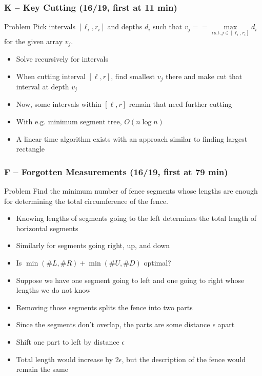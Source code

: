 \documentclass{beamer}
\begin{document}
\begin{frame}
\frametitle{K -- Key Cutting (16/19, first at 11 min)}
    \begin{block}{Problem}
        Pick intervals $[\ell_i, r_i]$ and depths $d_i$ such that $v_j == \underset{i\,\mathrm{s.t.}\,j \in [\ell_i, r_i]}{\max} d_i$ for the given array $v_j$.
    \end{block}
    \begin{itemize}
        \item Solve recursively for intervals
        \item When cutting interval $[\ell, r]$, find smallest $v_j$ there and make cut that interval at depth $v_j$
        \item Now, some intervals within $[\ell, r]$ remain that need further cutting
        \item With e.g. minimum segment tree, $O(n \log n)$
        \item A linear time algorithm exists with an approach similar to finding largest rectangle 
    \end{itemize}
\end{frame}

\begin{frame}
\frametitle{F -- Forgotten Measurements (16/19, first at 79 min)}
    \begin{block}{Problem}
        Find the minimum number of fence segments whose lengths are enough for determining the total circumference of the fence.
    \end{block}
    \begin{itemize}
        \item Knowing lengths of segments going to the left determines the total length of horizontal segments
        \item Similarly for segments going right, up, and down
        \item Is $\min(\#L, \#R) + \min(\#U, \#D)$ optimal?
        \item Suppose we have one segment going to left and one going to right whose lengths we do not know
        \item Removing those segments splits the fence into two parts
        \item Since the segments don't overlap, the parts are some distance $\epsilon$ apart
        \item Shift one part to left by distance $\epsilon$
        \item Total length would increase by $2\epsilon$, but the description of the fence would remain the same
    \end{itemize}
\end{frame}
\end{document}
